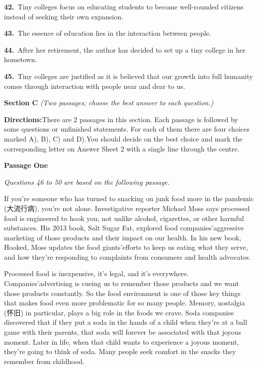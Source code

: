 \smallskip
\noindent\textbf{42.}\ Tiny colleges focus on educating students to become well-rounded citizens instead of seeking their own expansion.\par
\smallskip
\noindent\textbf{43.}\ The essence of education lies in the interaction between people.\par
\smallskip
\noindent\textbf{44.}\ After her retirement, the author has decided to set up a tiny college in her hometown.\par
\smallskip
\noindent\textbf{45.}\ Tiny colleges are justified as it is believed that our growth into full humanity comes through interaction with people near and dear to us.\par
\smallskip
\bigskip
\noindent\textbf{Section C}\quad
\noindent\textit{(Two passages; choose the best answer to each question.)}\par
\medskip
\noindent\textbf{Directions:}\quad There are 2 passages in this section. Each passage is followed by some questions or unfinished statements. For each of them there are four choices marked A), B), C) and D).You should decide on the best choice and mark the corresponding letter on Answer Sheet 2 with a single line through the centre.\par
\medskip
\noindent\textbf{Passage One}\par
\smallskip
\noindent\textit{Questions 46 to 50 are based on the following passage.}\par
\smallskip
\noindent If you're someone who has turned to snacking on junk food more in the pandemic (大流行病), you're not alone. Investigative reporter Michael Moss says processed food is engineered to hook you, not unlike alcohol, cigarettes, or other harmful substances. His 2013 book, Salt Sugar Fat, explored food companies'aggressive marketing of those products and their impact on our health. In his new book, Hooked, Moss updates the food giants'efforts to keep us eating what they serve, and how they're responding to complaints from consumers and health advocates.\par
\smallskip
\noindent Processed food is inexpensive, it's legal, and it's everywhere. Companies'advertising is cueing us to remember those products and we want those products constantly. So the food environment is one of those key things that makes food even more problematic for so many people. Memory, nostalgia (怀旧) in particular, plays a big role in the foods we crave. Soda companies discovered that if they put a soda in the hands of a child when they're at a ball game with their parents, that soda will forever be associated with that joyous moment. Later in life, when that child wants to experience a joyous moment, they're going to think of soda. Many people seek comfort in the snacks they remember from childhood.\par
